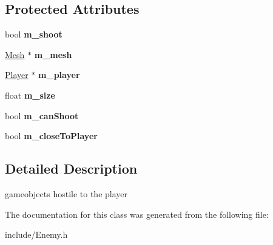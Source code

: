 \subsection*{Protected Attributes}
\begin{DoxyCompactItemize}
\item 
bool {\bfseries m\+\_\+shoot}\hypertarget{classEnemy_a0adddde568ab04784f55483345a8a91f}{}\label{classEnemy_a0adddde568ab04784f55483345a8a91f}

\item 
\hyperlink{classMesh}{Mesh} $\ast$ {\bfseries m\+\_\+mesh}\hypertarget{classEnemy_afebfefd6f39ac7e7ff50a973861de65b}{}\label{classEnemy_afebfefd6f39ac7e7ff50a973861de65b}

\item 
\hyperlink{classPlayer}{Player} $\ast$ {\bfseries m\+\_\+player}\hypertarget{classEnemy_a98d4492b5b0884704a8bf30d3f53108c}{}\label{classEnemy_a98d4492b5b0884704a8bf30d3f53108c}

\item 
float {\bfseries m\+\_\+size}\hypertarget{classEnemy_abc4b39ceb10b8f9741b41c22cd0c6554}{}\label{classEnemy_abc4b39ceb10b8f9741b41c22cd0c6554}

\item 
bool {\bfseries m\+\_\+can\+Shoot}\hypertarget{classEnemy_a387cb17e4c46c8e8663b6313e0962274}{}\label{classEnemy_a387cb17e4c46c8e8663b6313e0962274}

\item 
bool {\bfseries m\+\_\+close\+To\+Player}\hypertarget{classEnemy_a3801f0224fad82ac775a371b4c576e0c}{}\label{classEnemy_a3801f0224fad82ac775a371b4c576e0c}

\end{DoxyCompactItemize}


\subsection{Detailed Description}
gameobjects hostile to the player 

The documentation for this class was generated from the following file\+:\begin{DoxyCompactItemize}
\item 
include/Enemy.\+h\end{DoxyCompactItemize}
